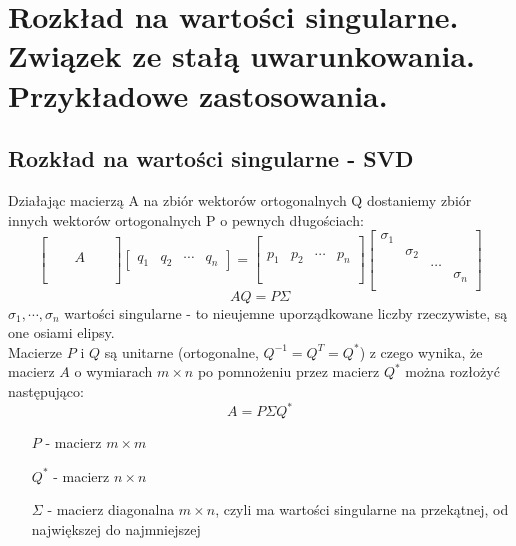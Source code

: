 \documentclass[a4paper]{article}
\begin{document}
\section{Rozkład na wartości singularne. Związek ze stałą uwarunkowania. Przykładowe zastosowania.}

\subsection{Rozkład na wartości singularne - SVD}
Działając macierzą A na zbiór wektorów ortogonalnych Q dostaniemy zbiór innych wektorów ortogonalnych P o pewnych długościach:
\begin{equation*}
    \begin{bmatrix}
        &&&& \\
        &&&& \\
        &&A&& \\
        &&&& \\
        &&&& \\
    \end{bmatrix}
    \begin{bmatrix}
        q_1 & q_2 & \cdots & q_n
    \end{bmatrix}
    =
    \begin{bmatrix}
        &&& \\
        &&& \\
        p_1 & p_2 & \cdots & p_n  \\
        &&& \\
        &&& \\
    \end{bmatrix}
    \begin{bmatrix}
        \sigma_1 &&& \\
        & \sigma_2 && \\
        && \dots &  \\
        &&& \sigma_n \\
    \end{bmatrix}
\end{equation*}
\begin{equation*}
    AQ = P\Sigma
\end{equation*}
$\sigma_1, \cdots, \sigma_n$ wartości singularne - to nieujemne uporządkowane liczby rzeczywiste, są one osiami elipsy. \\

Macierze $P$ i $Q$ są unitarne (ortogonalne, $Q^{-1} = Q^T = Q^*$) z czego wynika, że macierz $A$ o wymiarach $m \times n$ po pomnożeniu przez macierz $Q^*$ można rozłożyć następująco:
\begin{equation*}
    A = P \Sigma Q^*
\end{equation*}
\begin{itemize}
    \item[$P$] - macierz $m \times m$ 
    \item[$Q^*$] - macierz $n \times n$
    \item[$\Sigma$] - macierz diagonalna $m \times n$, czyli ma wartości singularne na przekątnej, od największej do najmniejszej
\end{itemize}
\end{document}
